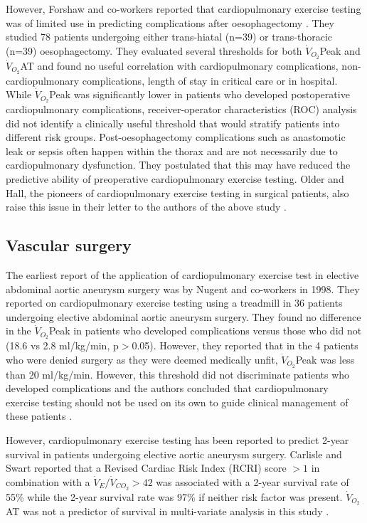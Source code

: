 However, Forshaw and co-workers reported that cardiopulmonary exercise testing was of limited use in predicting complications after oesophagectomy \parencite{forshaw_is_2008}. 
They studied 78 patients undergoing either trans-hiatal (n=39) or trans-thoracic (n=39) oesophagectomy. 
They evaluated several thresholds for both $\dot{V}_{O_2}$Peak and $\dot{V}_{O_2}$AT and found no useful correlation with cardiopulmonary complications, non-cardiopulmonary complications, length of stay in critical care or in hospital. 
While $\dot{V}_{O_2}$Peak was significantly lower in patients who developed postoperative cardiopulmonary complications, receiver-operator characteristics (ROC) analysis did not identify a clinically useful threshold that would stratify patients into different risk groups. 
Post-oesophagectomy complications such as anastomotic leak or sepsis often happen within the thorax and are not necessarily due to cardiopulmonary dysfunction.
They postulated that this may have reduced the predictive ability of preoperative cardiopulmonary exercise testing.
Older and Hall, the pioneers of cardiopulmonary exercise testing in surgical patients, also raise this issue in their letter to the authors of the above study \parencite{hall_cardiopulmonary_2009}. 

\subsection{Vascular surgery}
The earliest report of the application of cardiopulmonary exercise test in elective abdominal aortic aneurysm surgery was by Nugent and co-workers in 1998. 
They reported on cardiopulmonary exercise testing using a treadmill in 36 patients undergoing elective abdominal aortic aneurysm surgery. 
They found no difference in the $\dot{V}_{O_2}$Peak in patients who developed complications versus those who did not (18.6 vs 2.8 ml/kg/min, p$>$0.05). 
However, they reported that in the 4 patients who were denied surgery as they were deemed medically unfit, $\dot{V}_{O_2}$Peak was less than 20 ml/kg/min. 
However, this threshold did not discriminate patients who developed complications and the authors concluded that cardiopulmonary exercise testing should not be used on its own to guide clinical management of these patients \parencite{nugent_cardiopulmonary_1998}. 

However, cardiopulmonary exercise testing has been reported to predict 2-year survival in patients undergoing elective aortic aneurysm surgery. 
Carlisle and Swart reported that a Revised Cardiac Risk Index (RCRI) score $>1$ in combination with a $\dot{V}_E/\dot{V}_{CO_2}>42$ was associated with a 2-year survival rate of 55\% while the 2-year survival rate was 97\% if neither risk factor was present. $\dot{V}_{O_2}$AT was not a predictor of survival in multi-variate analysis in this study \parencite{carlisle_mid-term_2007}. 

